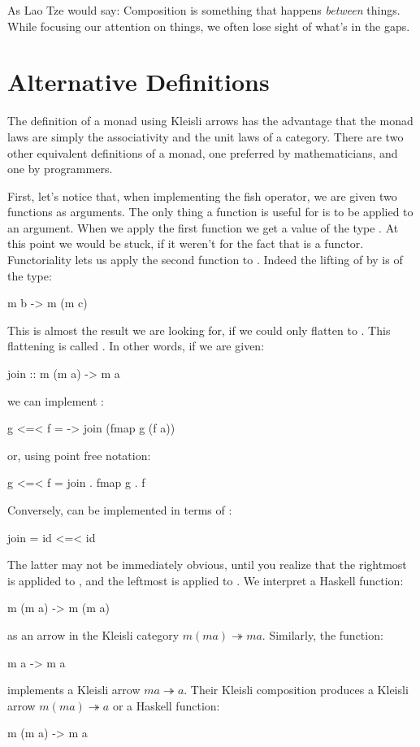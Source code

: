 \documentclass[DaoFP]{subfiles}
\begin{document}
As Lao Tze would say: Composition is something that happens \emph{between} things. While focusing our attention on things, we often lose sight of what's in the gaps. 

\section{Alternative Definitions}

The definition of a monad using Kleisli arrows has the advantage that the monad laws are simply the associativity and the unit laws of a category. There are two other equivalent definitions of a monad, one preferred by mathematicians, and one by programmers. 

First, let's notice that, when implementing the fish operator, we are given two functions as arguments. The only thing a function is useful for is to be applied to an argument. When we apply the first function  we get a value of the type . At this point we would be stuck, if it weren't for the fact that  is a functor. Functoriality lets us apply the second function  to . Indeed the lifting of  by  is of the type:
\begin{haskell}
m b -> m (m c)
\end{haskell}
This is almost the result we are looking for, if we could only flatten  to . This flattening is called . In other words, if we are given:
\begin{haskell}
join ::  m (m a) -> m a
\end{haskell}
we can implement \hask{<=<}:
\begin{haskell}
g <=< f = \a -> join (fmap g (f a))
\end{haskell}
or, using point free notation:
\begin{haskell}
g <=< f = join . fmap g . f
\end{haskell}

Conversely,  can be implemented in terms of \hask{<=<}:
\begin{haskell}
join = id <=< id
\end{haskell}
The latter may not be immediately obvious, until you realize that the rightmost  is applided to , and the leftmost is applied to . We interpret a Haskell function:
\begin{haskell}
m (m a) -> m (m a)
\end{haskell}
as an arrow in the Kleisli category $ m (m a) \twoheadrightarrow m a$. Similarly, the function:
\begin{haskell}
m a -> m a
\end{haskell}
implements a Kleisli arrow $m a \twoheadrightarrow a$. Their Kleisli composition produces a Kleisli arrow $m (m a) \twoheadrightarrow a$ or a Haskell function:
\begin{haskell}
m (m a) -> m a
\end{haskell}
\end{document}
